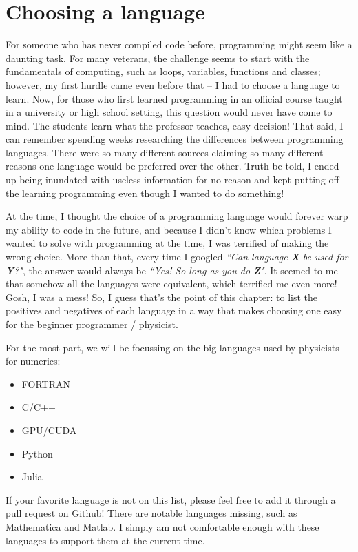 \chapter{Choosing a language}

For someone who has never compiled code before, programming might seem like a daunting task. 
For many veterans, the challenge seems to start with the fundamentals of computing, such as loops, variables, functions and classes; however, my first hurdle came even before that -- I had to choose a language to learn.
Now, for those who first learned programming in an official course taught in a university or high school setting, this question would never have come to mind. 
The students learn what the professor teaches, easy decision!
That said, I can remember spending weeks researching the differences between programming languages.
There were so many different sources claiming so many different reasons one language would be preferred over the other.
Truth be told, I ended up being inundated with useless information for no reason and kept putting off the learning programming even though I wanted to do something!

At the time, I thought the choice of a programming language would forever warp my ability to code in the future, and because I didn't know which problems I wanted to solve with programming at the time, I was terrified of making the wrong choice. 
More than that, every time I googled \textit{``Can language \textbf{X} be used for \textbf{Y}?"}, the answer would always be \textit{``Yes! So long as you do \textbf{Z}"}.
It seemed to me that somehow all the languages were equivalent, which terrified me even more!
Gosh, I was a mess!
So, I guess that's the point of this chapter: to list the positives and negatives of each language in a way that makes choosing one easy for the beginner programmer / physicist.

For the most part, we will be focussing on the big languages used by physicists for numerics:
\begin{itemize}
\item FORTRAN
\item C/C++
\item GPU/CUDA
\item Python
\item Julia
\end{itemize}

If your favorite language is not on this list, please feel free to add it through a pull request on Github! 
There are notable languages missing, such as Mathematica and Matlab.
I simply am not comfortable enough with these languages to support them at the current time.

